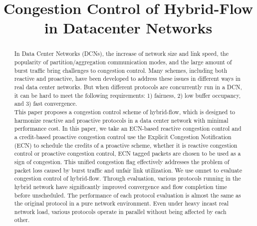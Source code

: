 \documentclass[conference]{IEEEtran}
\begin{document}
\title{Congestion Control of Hybrid-Flow in Datacenter Networks\\
}

\author{

}

\maketitle

\begin{abstract}

In Data Center Networks (DCNs), the increase of network size and link speed, the popularity of partition/aggregation communication modes, and the large amount of burst traffic bring challenges to congestion control. Many schemes, including both reactive and proactive, have been developed to address these issues in different ways in real data center networks. But when different protocols are concurrently run in a DCN, it can be hard to meet the following requirements: 1) fairness, 2) low buffer occupancy, and 3) fast convergence.\\
\indent This paper proposes a congestion control scheme of hybrid-flow, which is designed to harmonize reactive and proactive protocols in a data center network with minimal performance cost. In this paper, we take an ECN-based reactive congestion control and a credit-based proactive congestion control use the Explicit Congestion Notification (ECN) to schedule the credits of a proactive scheme, whether it is reactive congestion control or proactive congestion control, ECN tagged packets are chosen to be used as a sign of congestion. This unified congestion flag effectively addresses the problem of packet loss caused by burst traffic and unfair link utilization. We use omnet to evaluate congestion control of hybrid-flow. Through evaluation, various protocols running in the hybrid network have significantly improved convergence and flow completion time before unscheduled. The performance of each protocol evaluation is almost the same as the original protocol in a pure network environment. Even under heavy incast real network load, various protocols operate in parallel without being affected by each other.

\end{abstract}
\end{document}
